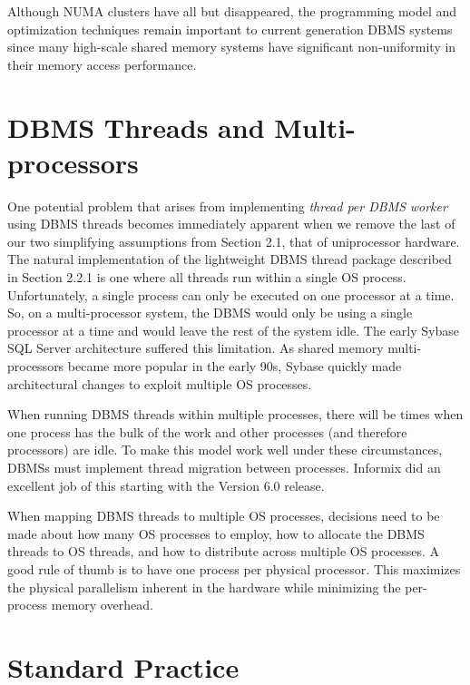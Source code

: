\documentclass[a4paper,11pt,twoside,openright]{book}
\begin{document}
Although NUMA clusters have all but disappeared, the programming model
and optimization techniques remain important to current generation DBMS
systems since many high-scale shared memory systems have significant
non-uniformity in their memory access performance.

\hypertarget{dbms-threads-and-multi-processors}{%
\section{DBMS Threads and
Multi-processors}\label{dbms-threads-and-multi-processors}}

One potential problem that arises from implementing \emph{thread per
DBMS} \emph{worker} using DBMS threads becomes immediately apparent when
we remove the last of our two simplifying assumptions from Section 2.1,
that of uniprocessor hardware. The natural implementation of the
lightweight DBMS thread package described in Section 2.2.1 is one where
all threads run within a single OS process. Unfortunately, a single
process can only be executed on one processor at a time. So, on a
multi-processor system, the DBMS would only be using a single processor
at a time and would leave the rest of the system idle. The early Sybase
SQL Server architecture suffered this limitation. As shared memory
multi-processors became more popular in the early 90s, Sybase quickly
made architectural changes to exploit multiple OS processes.

When running DBMS threads within multiple processes, there will be times
when one process has the bulk of the work and other processes (and
therefore processors) are idle. To make this model work well under these
circumstances, DBMSs must implement thread migration between processes.
Informix did an excellent job of this starting with the Version 6.0
release.

When mapping DBMS threads to multiple OS processes, decisions need to be
made about how many OS processes to employ, how to allocate the DBMS
threads to OS threads, and how to distribute across multiple OS
processes. A good rule of thumb is to have one process per physical
processor. This maximizes the physical parallelism inherent in the
hardware while minimizing the per-process memory overhead.

\hypertarget{standard-practice-1}{%
\section{Standard Practice}\label{standard-practice-1}}
\end{document}
